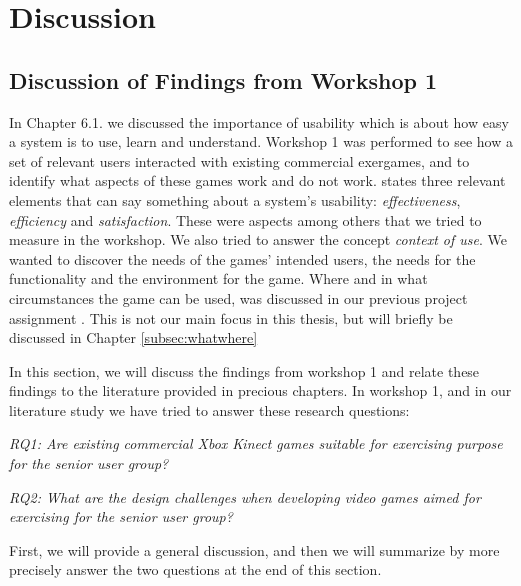 \chapter{Discussion}
\label{chap:discussion}

\section{Discussion of Findings from Workshop 1}

In Chapter 6.1. we discussed the importance of usability which is about how easy a system is to use, learn and understand. Workshop 1 was performed to see how a set of relevant users interacted with existing commercial exergames, and to identify what aspects of these games work and do not work. \cite{usabilitydef} states three relevant elements that can say something about a system's usability: \emph{effectiveness}, \emph{efficiency}  and \emph{satisfaction}. These were aspects among others that we tried to measure in the workshop. We also tried to answer the concept \emph{context of use}. We wanted to discover the needs of the games' intended users, the needs for the functionality and the environment for the game. Where and in what circumstances the game can be used, was discussed in our previous project assignment \cite{project}. This is not our main focus in this thesis, but will briefly be discussed in Chapter \ref{subsec:whatwhere} 

In this section, we will discuss the findings from workshop 1 and relate these findings to the literature provided in precious chapters. In workshop 1, and in our literature study we have tried to answer these research questions: 

\emph{RQ1: Are existing commercial Xbox Kinect games suitable for exercising purpose for the senior user group?}

\emph{RQ2: What are the design challenges when developing video games aimed for exercising for the senior user group?}

First, we will provide a general discussion, and then we will summarize by more precisely answer the two questions at the end of this section. 

